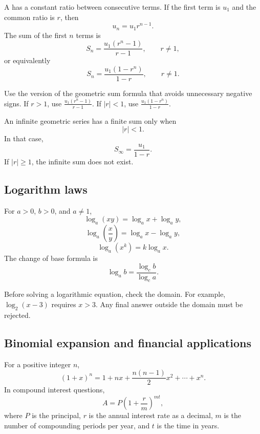 \begin{skillbox}
A  has a constant ratio between consecutive terms. If the first term is $u_1$ and the common ratio is $r$, then
\[
    u_n = u_1r^{n-1}.
\]
The sum of the first $n$ terms is
\[
    S_n = \frac{u_1(r^n-1)}{r-1}, \qquad r\neq 1,
\]
or equivalently
\[
    S_n = \frac{u_1(1-r^n)}{1-r}, \qquad r\neq 1.
\]
\end{skillbox}

\begin{examtipbox}
Use the version of the geometric sum formula that avoids unnecessary negative signs. If $r>1$, use $\frac{u_1(r^n-1)}{r-1}$. If $|r|<1$, use $\frac{u_1(1-r^n)}{1-r}$.
\end{examtipbox}

\begin{skillbox}
An infinite geometric series has a finite sum only when
\[
    |r|<1.
\]
In that case,
\[
    S_\infty = \frac{u_1}{1-r}.
\]
If $|r|\geq 1$, the infinite sum does not exist.
\end{skillbox}

\subsection{Logarithm laws}

\begin{skillbox}
For $a>0$, $b>0$, and $a\neq 1$,
\[
    \log_a(xy)=\log_a x+\log_a y,
\]
\[
    \log_a\left(\frac{x}{y}\right)=\log_a x-\log_a y,
\]
\[
    \log_a(x^k)=k\log_a x.
\]
The change of base formula is
\[
    \log_a b = \frac{\log_c b}{\log_c a}.
\]
\end{skillbox}

\begin{examtipbox}
Before solving a logarithmic equation, check the domain. For example, $\log_2(x-3)$ requires $x>3$. Any final answer outside the domain must be rejected.
\end{examtipbox}

\subsection{Binomial expansion and financial applications}

\begin{skillbox}
For a positive integer $n$,
\[
    (1+x)^n = 1+nx+\frac{n(n-1)}{2}x^2+\cdots+x^n.
\]
In compound interest questions,
\[
    A=P\left(1+\frac{r}{m}\right)^{mt},
\]
where $P$ is the principal, $r$ is the annual interest rate as a decimal, $m$ is the number of compounding periods per year, and $t$ is the time in years.
\end{skillbox}

